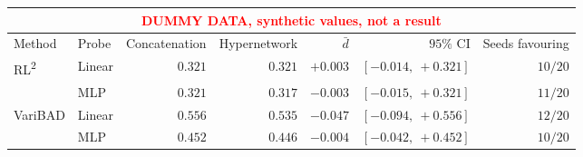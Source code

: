 \setlength{\tabcolsep}{4pt}
\begin{tabular}{llrrrrr}
\toprule
\multicolumn{7}{c}{\textcolor{red}{\footnotesize DUMMY DATA, synthetic values, not a result}} \\
\hline
Method & Probe & Concatenation & Hypernetwork & $\bar{d}$ & $95\%$ CI & Seeds favouring \\
\midrule
RL\textsuperscript{2} & Linear & $0.321$ & $0.321$ & $+0.003$ & $[-0.014,\ +0.321]$ & $10/20$ \\
 & MLP & $0.321$ & $0.317$ & $-0.003$ & $[-0.015,\ +0.321]$ & $11/20$ \\
\cmidrule(l){2-7}
VariBAD & Linear & $0.556$ & $0.535$ & $-0.047$ & $[-0.094,\ +0.556]$ & $12/20$ \\
 & MLP & $0.452$ & $0.446$ & $-0.004$ & $[-0.042,\ +0.452]$ & $10/20$ \\
\bottomrule
\end{tabular}
